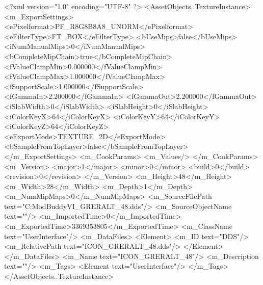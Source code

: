 <?xml version="1.0" encoding="UTF-8" ?>
<AssetObjects..TextureInstance>
	<m_ExportSettings>
		<ePixelformat>PF_R8G8B8A8_UNORM</ePixelformat>
		<eFilterType>FT_BOX</eFilterType>
		<bUseMips>false</bUseMips>
		<iNumManualMips>0</iNumManualMips>
		<bCompleteMipChain>true</bCompleteMipChain>
		<fValueClampMin>0.000000</fValueClampMin>
		<fValueClampMax>1.000000</fValueClampMax>
		<fSupportScale>1.000000</fSupportScale>
		<fGammaIn>2.200000</fGammaIn>
		<fGammaOut>2.200000</fGammaOut>
		<iSlabWidth>0</iSlabWidth>
		<iSlabHeight>0</iSlabHeight>
		<iColorKeyX>64</iColorKeyX>
		<iColorKeyY>64</iColorKeyY>
		<iColorKeyZ>64</iColorKeyZ>
		<eExportMode>TEXTURE_2D</eExportMode>
		<bSampleFromTopLayer>false</bSampleFromTopLayer>
	</m_ExportSettings>
	<m_CookParams>
		<m_Values/>
	</m_CookParams>
	<m_Version>
		<major>1</major>
		<minor>0</minor>
		<build>0</build>
		<revision>0</revision>
	</m_Version>
	<m_Height>48</m_Height>
	<m_Width>28</m_Width>
	<m_Depth>1</m_Depth>
	<m_NumMipMaps>0</m_NumMipMaps>
	<m_SourceFilePath text="C:\Users\asus\Documents\Firaxis ModBuddy\Civilization VI\temppic\ICON_GRERALT_48.dds"/>
	<m_SourceObjectName text=""/>
	<m_ImportedTime>0</m_ImportedTime>
	<m_ExportedTime>3369353805</m_ExportedTime>
	<m_ClassName text="UserInterface"/>
	<m_DataFiles>
		<Element>
			<m_ID text="DDS"/>
			<m_RelativePath text="ICON_GRERALT_48.dds"/>
		</Element>
	</m_DataFiles>
	<m_Name text="ICON_GRERALT_48"/>
	<m_Description text=""/>
	<m_Tags>
		<Element text="UserInterface"/>
	</m_Tags>
</AssetObjects..TextureInstance>

